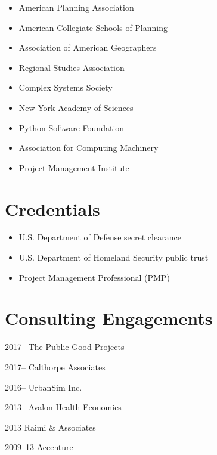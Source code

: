 \documentclass{academiccv}
\begin{document}
\begin{itemize}
	
\item American Planning Association

\item American Collegiate Schools of Planning

\item Association of American Geographers

\item Regional Studies Association

\item Complex Systems Society

\item New York Academy of Sciences

\item Python Software Foundation

\item Association for Computing Machinery

\item Project Management Institute

\end{itemize}



\section*{Credentials}

\begin{itemize}
	
\item U.S. Department of Defense secret clearance

\item U.S. Department of Homeland Security public trust

\item Project Management Professional (PMP)

\end{itemize}



\section*{Consulting Engagements}

\begin{tablist}

\item[2017--]   \tab The Public Good Projects	

\item[2017--]   \tab Calthorpe Associates

\item[2016--]   \tab UrbanSim Inc.

\item[2013--]   \tab Avalon Health Economics

\item[2013]     \tab Raimi \& Associates

\item[2009--13] \tab Accenture

\end{tablist}
\end{document}

